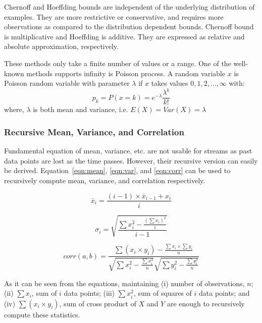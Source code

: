 Chernoff and Hoeffding bounds are independent of the underlying distribution of examples. They are more restrictive or conservative, and requires more observations as compared to the distribution dependent bounds. Chernoff bound is multiplicative and Hoeffding is additive. They are expressed as relative and absolute approximation, respectively.

These methods only take a finite number of values or a range. One of the well-known methods supports infinity is Poisson process. A random variable $x$ is Poisson random variable with parameter $\lambda$ if $x$ takes values $0,1,2, \dots, \infty$ with:
    \begin{equation}
    \label{eqn:poisson}
        p_k = P(x=k) = e^{-\lambda} \frac{\lambda^k}{k!}
    \end{equation}
where, $\lambda$ is both mean and variance, i.e. $E(X) = Var(X) = \lambda$
    
\subsubsection{Recursive Mean, Variance, and Correlation}
Fundamental equation of mean, variance, etc. are not usable for streams as past data points are lost as the time passes. However, their recursive version can easily be derived. Equation~\ref{eqn:mean}, \ref{eqn:var}, and \ref{eqn:corr} can be used to recursively compute mean, variance, and correlation respectively.

\begin{equation}
\label{eqn:mean}
    \bar{x}_i = \frac{(i-1) \times \bar{x}_{i-1} + x_i}{i}
\end{equation}

\begin{equation}
\label{eqn:var}
    \sigma_i = \sqrt{ \frac{\sum x_i^2 - \frac{ (\sum x_i )^2}{i} }{i-1} }
\end{equation}

\begin{equation}
\label{eqn:corr}
    corr(a, b) = \frac{ \sum(x_i \times y_i) - \frac{\sum x_i \times \sum y_i}{n} }{\sqrt{\sum x_i^2 - \frac{\sum x_i^2}{n}} \sqrt{\sum y_i^2 - \frac{\sum y_i^2}{n}}}
\end{equation}

As it can be seen from the equations, maintaining (i) number of observations, $n$; (ii) $\sum x_i$, sum of $i$ data points; (iii) $\sum x_i^2$, sum of squares of $i$ data points; and (iv) $\sum (x_i \times y_i)$, sum of cross product of $X$ and $Y$ are enough to recursively compute these statistics.


